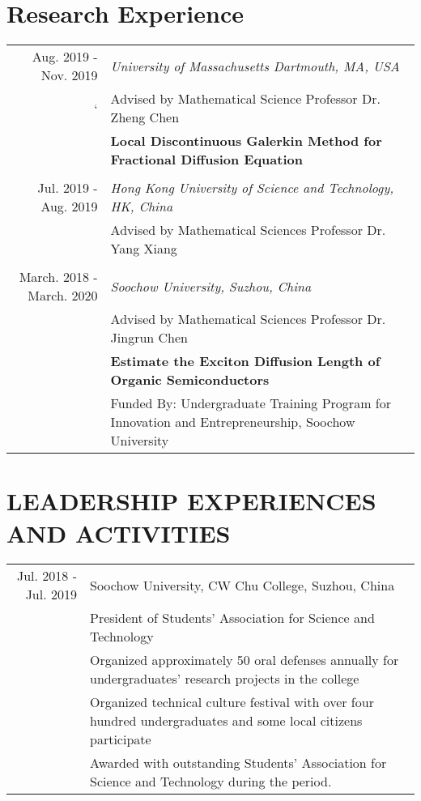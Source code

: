\documentclass[a4paper,10pt,utf8]{article} %
\begin{document}
\section{Research Experience}
\begin{tabular}{r|p{11cm}}	
	Aug. 2019 - Nov. 2019 					& \textit{University of Massachusetts Dartmouth, MA, USA}\\
	`					&Advised by Mathematical Science Professor Dr. Zheng Chen\\   
	& \textbf{Local Discontinuous Galerkin Method for Fractional Diffusion Equation }\\
	
	\multicolumn{2}{c}{} \\	%
	
	Jul. 2019 - Aug. 2019  					& \textit{Hong Kong University of Science and Technology, HK, China}\\
	& Advised by Mathematical Sciences Professor Dr. Yang Xiang     \\
	
	\multicolumn{2}{c}{} \\
	
	 March. 2018 - March. 2020 						& \textit{Soochow University, Suzhou, China}\\ 
	 & Advised by Mathematical Sciences Professor Dr. Jingrun Chen\\
	 & \textbf{Estimate the Exciton Diffusion Length of Organic Semiconductors}\\
	 &  Funded By: Undergraduate Training Program for Innovation and Entrepreneurship, Soochow University \\
\end{tabular}
\section{LEADERSHIP EXPERIENCES AND ACTIVITIES}
\begin{tabular}{r|p{11cm}}
	Jul. 2018 - Jul. 2019 		& Soochow University, CW Chu College, Suzhou, China \\
								&  President of Students' Association for Science and Technology \\
								& \footnotesize Organized approximately 50 oral defenses annually for undergraduates’ research projects in the college \\
								& \footnotesize Organized technical culture festival with over four hundred undergraduates and some local citizens participate\\
								& \footnotesize Awarded with outstanding Students' Association for Science and Technology during the period.
\end{tabular}
\end{document}
